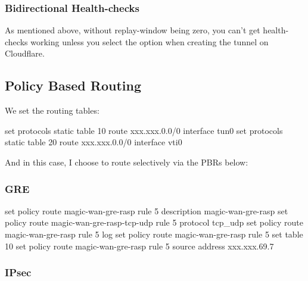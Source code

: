 \documentclass[
]{article}
\newenvironment{Shaded}{\begin{snugshade}}{\end{snugshade}}
\newcommand{\BuiltInTok}[1]{#1}
\newcommand{\NormalTok}[1]{#1}
\newcommand{\StringTok}[1]{\textcolor[rgb]{0.31,0.60,0.02}{#1}}
\begin{document}
\subsubsection{Bidirectional
Health-checks}\label{bidirectional-health-checks}

As mentioned above, without replay-window being zero, you can't get
health-checks working unless you select the option when creating the
tunnel on Cloudflare.

\subsection{Policy Based Routing}\label{policy-based-routing}

We set the routing tables:

\begin{Shaded}
\begin{Highlighting}[numbers=left,,]
\BuiltInTok{set}\NormalTok{ protocols static table 10 route xxx.xxx.0.0/0 interface tun0}
\BuiltInTok{set}\NormalTok{ protocols static table 20 route xxx.xxx.0.0/0 interface vti0}
\end{Highlighting}
\end{Shaded}

And in this case, I choose to route selectively via the PBRs below:

\subsubsection{GRE}\label{gre-1}

\begin{Shaded}
\begin{Highlighting}[numbers=left,,]
\BuiltInTok{set}\NormalTok{ policy route magic{-}wan{-}gre{-}rasp rule 5 description }\StringTok{\textquotesingle{}magic{-}wan{-}gre{-}rasp\textquotesingle{}}
\BuiltInTok{set}\NormalTok{ policy route magic{-}wan{-}gre{-}rasp{-}tcp{-}udp rule 5 protocol }\StringTok{\textquotesingle{}tcp\_udp\textquotesingle{}}
\BuiltInTok{set}\NormalTok{ policy route magic{-}wan{-}gre{-}rasp rule 5 log}
\BuiltInTok{set}\NormalTok{ policy route magic{-}wan{-}gre{-}rasp rule 5 set table }\StringTok{\textquotesingle{}10\textquotesingle{}}
\BuiltInTok{set}\NormalTok{ policy route magic{-}wan{-}gre{-}rasp rule 5 source address }\StringTok{\textquotesingle{}xxx.xxx.69.7\textquotesingle{}}
\end{Highlighting}
\end{Shaded}

\subsubsection{IPsec}\label{ipsec-1}
\end{document}
